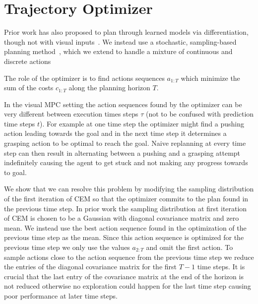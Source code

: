 \section{Trajectory Optimizer}
\label{sec:optimizer}
Prior work has also proposed to plan through learned models via differentiation, though not with visual inputs~\cite{deep_mpc}. We instead use a stochastic, sampling-based planning method~\cite{cem-rk-13,foresight}, which we extend to handle a mixture of continuous and discrete actions

The role of the optimizer is to find actions sequences $a_{1:T}$ which minimize the sum of the costs $c_{1:T}$ along the planning horizon $T$.

In the visual MPC setting the action sequences found by the optimizer can be very different between execution times steps $\tau$ (not to be confused with prediction time steps $t$). For example at one time step the optimizer might find a pushing action leading towards the goal and in the next time step it determines a grasping action to be optimal to reach the goal. Naive replanning at every time step can then result in alternating between a pushing and a grasping attempt indefinitely causing the agent to get stuck and not making any progress towards to goal. 

We show that we can resolve this problem by modifying the sampling distribution of the first iteration of CEM so that the optimizer commits to the plan found in the previous time step. In prior work \cite{sna} the sampling distribution at first iteration of CEM is chosen to be a Gaussian with diagonal covariance matrix and zero mean. We instead use the best action sequence found in the optimization of the previous time step as the mean. Since this action sequence is optimized for the previous time step we only use the values $a_{2:T}$ and omit the first action. To sample actions close to the action sequence from the previous time step we reduce the entries of the diagonal covariance matrix for the first $T-1$ time steps. It is crucial that the last entry of the covariance matrix at the end of the horizon is not reduced otherwise no exploration could happen for the last time step causing poor performance at later time steps.